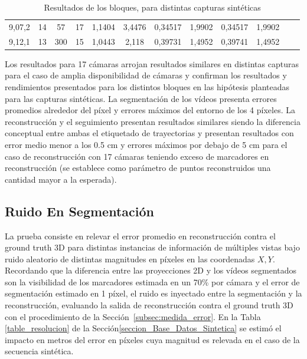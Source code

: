 \begin{table}[h]
{\begin{tabular}{cccc|c|c|c|c|c|c|ll}
\multicolumn{1}{|c|}{9,07,2}  & \multicolumn{1}{c|}{14}         & \multicolumn{1}{c|}{57}     & 17      & 1,1404 & 3,4476  & 0,34517     & 1,9902  & 0,34517     & 1,9902  &  &  \\ \cline{1-10}
\multicolumn{1}{|c|}{9,12,1}  & \multicolumn{1}{c|}{13}         & \multicolumn{1}{c|}{300}    & 15      & 1,0443 & 2,118   & 0,39731     & 1,4952  & 0,39741     & 1,4952  &  &  \\ \cline{1-10}
\end{tabular}
}
\caption{Resultados de los bloques, para distintas capturas sintéticas}
\label{resultados_distintas_capturas}
\end{table}

Los resultados para 17 cámaras arrojan resultados similares en distintas capturas para el caso de amplia disponibilidad de cámaras y confirman los resultados y rendimientos presentados para los distintos bloques en las hipótesis planteadas para las capturas sintéticas. La segmentación de los vídeos presenta errores promedios alrededor del píxel y errores máximos del entorno de los 4 píxeles. La reconstrucción y el seguimiento presentan resultados similares siendo la diferencia conceptual entre ambas el etiquetado de trayectorias y presentan resultados con error medio menor a los 0.5 cm y errores máximos por debajo de 5 cm para el caso de reconstrucción con 17 cámaras teniendo exceso de marcadores en reconstrucción (se establece como parámetro de puntos reconstruidos una cantidad mayor a la esperada). 

\subsection{Ruido En Segmentación}

La prueba consiste en relevar el error promedio en reconstrucción contra el ground truth 3D para distintas instancias de información de múltiples vistas bajo ruido aleatorio de distintas magnitudes en píxeles en las coordenadas $X,Y$. Recordando que la diferencia entre las proyecciones 2D y los vídeos segmentados son la visibilidad de los marcadores estimada en un 70\% por cámara y el error de segmentación estimado en 1 píxel, el ruido es inyectado entre la segmentación y la reconstrucción, evaluando la salida de reconstrucción contra el ground truth 3D con el procedimiento de la Sección~\ref{subsec:medida_error}. En la Tabla \ref{table_resolucion} de la Sección\ref{seccion_Base_Datos_Sintetica} se estimó el impacto en metros del error en píxeles cuya magnitud es relevada en el caso de la secuencia sintética.

